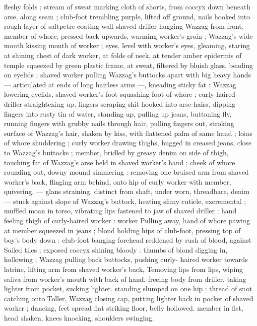 fleshy folds ; stream of sweat marking cloth of shorts, from coccyx 
down beneath arse, along seam ; club-foot trembling purple, lifted 
off ground, nails hooked into rough layer of saltpetre coating wall 
shaved driller hugging Wazzag from front, member of whore, 
pressed back upwards, warming worker's groin ; Wazzag's wide 
mouth kissing mouth of worker ; eyes, level with worker's eyes, 
gleaming, staring at shining chest of dark worker, at folds of neck, at 
tender amber epidermis of temple squeezed by green plastic frame, 
at sweat, filtered by bluish glass, beading on eyelids ; shaved worker 
pulling Wazzag's buttocks apart with big heavy hands --- articulated 
at ends of long hairless arms ---, kneading sticky fat : Wazzag 
lowering eyelids, shaved worker's foot squashing foot of whore ; 
curly-haired driller straightening up, fingers scraping shit hooked 
into arse-hairs, dipping fingers into rusty tin of water, standing up, 
pulling up jeans, buttoning fly, running fingers with grubby nails 
through hair, pulling fingers out, stroking surface of Wazzag's hair, 
shaken by kiss, with flattened palm of same hand ; loins of whore 
shuddering ; curly worker drawing thighs, hugged in creased jeans, 
close to Wazzag's buttocks ; member, bridled by greasy denim on 
side of thigh, touching fat of Wazzag's arse held in shaved worker's 
hand ; cheek of whore rounding out, downy mound simmering : 
removing one bruised arm from shaved worker's back, flinging arm 
behind, onto hip of curly worker with member, quivering, --- glans 
straining. distinct from shaft, under worn, threadbare, denim --- 
stuck against slope of Wazzag's buttock, heating slimy cuticle, 
excremental ; muffled moan in torso, vibrating lips fastened to jaw of 
shaved driller ; hand feeling thigh of curly-haired worker : worker 
Pulling away, hand of whore pawing at member squeezed in jeans ; 
blond holding hips of club-foot, pressing top of boy's body down : 
club-foot banging forehead reddened by rush of blood, against 
Soiled tiles ; exposed coccyx shining bloody : thumbs of blond 
digging in, hollowing ; Wazzag pulling back buttocks, pushing curly- 
haired worker towards latrine, lifting arm from shaved worker's back, 
Temoving lips from lips, wiping saliva from worker's mouth with back 
of hand. freeing body from driller, taking lighter from pocket, sucking 
lighter. standing slumped on one hip ; thread of snot catching onto 
Toller, Wazzag closing cap, putting lighter back in pocket of shaved 
worker ; dancing, feet spread flat striking floor, belly hollowed. 
member in fist, head shaken, knees knocking, shoulders swinging. 
